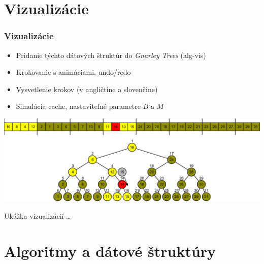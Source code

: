 \documentclass{beamer}
\begin{document}
\section{Vizualizácie}
\begin{frame}
    \frametitle{Vizualizácie}
    \begin{itemize}
        \item Pridanie týchto dátových štruktúr do \emph{Gnarley Trees} (alg-vis)
        \item Krokovanie s animáciami, undo/redo
        \item Vysvetlenie krokov (v angličtine a slovenčine)
        \item Simulácia cache, nastaviteľné parametre $B$ a $M$
    \end{itemize}
    \begin{center}
        \includegraphics[width=\textwidth]{../figures/screenshots/cachesim_big_step4}
    \end{center}
\end{frame}

\begin{frame}[plain]
\begin{center}
{\Large Ukážka vizualizácií \dots}
\end{center}
\end{frame}

\section{Algoritmy a dátové štruktúry}
\end{document}

